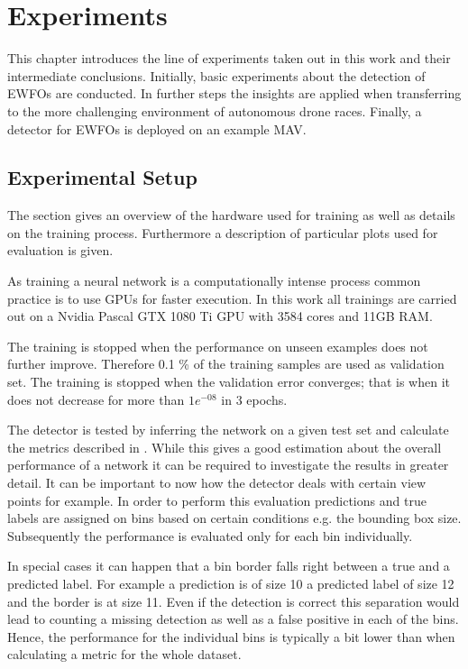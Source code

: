 \chapter{Experiments}

This chapter introduces the line of experiments taken out in this work and their intermediate conclusions. Initially, basic experiments about the detection of \acp{EWFO} are conducted. In further steps the insights are applied when transferring to the more challenging environment of autonomous drone races. Finally, a detector for \acp{EWFO} is deployed on an example \ac{MAV}.

\section{Experimental Setup}

The section gives an overview of the hardware used for training as well as details on the training process. Furthermore a description of particular plots used for evaluation is given.

As training a neural network is a computationally intense process common practice is to use \acp{GPU} for faster execution. In this work all trainings are carried out on a Nvidia Pascal GTX 1080 Ti GPU with 3584 cores and 11GB RAM.

The training is stopped when the performance on unseen examples does not further improve. Therefore 0.1 \% of the training samples are used as validation set. The training is stopped when the validation error converges; that is when it does not decrease for more than $1e^{-08}$ in 3 epochs.

The detector is tested by inferring the network on a given test set and calculate the metrics described in . While this gives a good estimation about the overall performance of a network it can be required to investigate the results in greater detail. It can be important to now how the detector deals with certain view points for example. In order to perform this evaluation predictions and true labels are assigned on bins based on certain conditions e.g. the bounding box size. Subsequently the performance is evaluated only for each bin individually.

In special cases it can happen that a bin border falls right between a true and a predicted label. For example a prediction is of size 10 a predicted label of size 12 and the border is at size 11. Even if the detection is correct this separation would lead to counting a missing detection as well as a false positive in each of the bins. Hence, the performance for the individual bins is typically a bit lower than when calculating a metric for the whole dataset.

